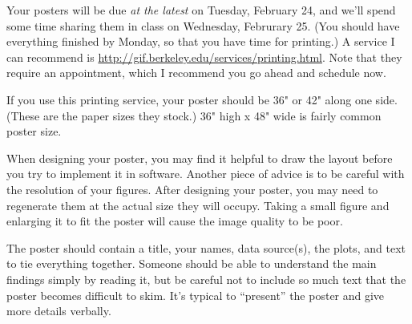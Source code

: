 \documentclass[11pt, oneside]{article}   	%
\begin{document}
Your posters will be due {\em at the latest} on Tuesday, February 24, and we'll
spend some time sharing them in class on Wednesday, Februrary 25. (You should
have everything finished by Monday, so that you have time for printing.) A
service I can recommend is
\url{http://gif.berkeley.edu/services/printing.html}. Note that they require an
appointment, which I recommend you go ahead and schedule now.

If you use this printing service, your poster should be 36" or 42" along one
side. (These are the paper sizes they stock.) 36" high x 48" wide is fairly
common poster size.

When designing your poster, you may find it helpful to draw the layout before
you try to implement it in software. Another piece of advice is to be careful
with the resolution of your figures. After designing your poster, you may need
to regenerate them at the actual size they will occupy. Taking a small figure
and enlarging it to fit the poster will cause the image quality to be poor.

The poster should contain a title, your names, data source(s), the plots, and
text to tie everything together. Someone should be able to understand the main
findings simply by reading it, but be careful not to include so much text that
the poster becomes difficult to skim. It's typical to ``present'' the poster and
give more details verbally. 
\end{document}
